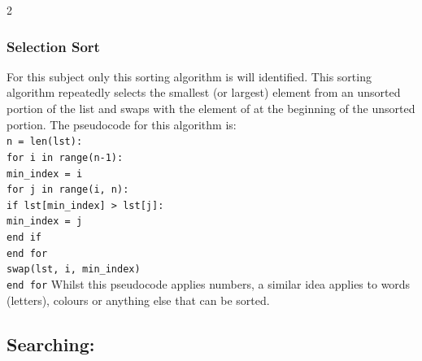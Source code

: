 \documentclass[a4paper]{report}
\begin{document}
\begin{flushleft}
\begin{multicols}{2}
	\subsubsection*{Selection Sort}
	For this subject only this sorting algorithm is will identified. This sorting algorithm repeatedly selects the smallest (or largest) element from an unsorted portion of the list and swaps with the element of at the beginning of the unsorted portion. The pseudocode for this algorithm is:\\
	\texttt{n = len(lst):}\\
	\texttt{for i in range(n-1):}\\
		\hspace{2em}\texttt{min\_index = i}\\
		\hspace{2em}\texttt{for j in range(i, n):}\\
			\hspace{4em}\texttt{if lst[min\_index] > lst[j]:}\\
				\hspace{6em}\texttt{min\_index = j}\\
			\hspace{4em}\texttt{end if}\\
		\hspace{2em}\texttt{end for}\\
		\hspace{2em}\texttt{swap(lst, i, min\_index)}\\
	\texttt{end for}
	\hfill\break\break
	Whilst this pseudocode applies numbers, a similar idea applies to words (letters), colours or anything else that can be sorted.

	\subsection*{Searching:}

\end{multicols}
\end{flushleft}
\end{document}
